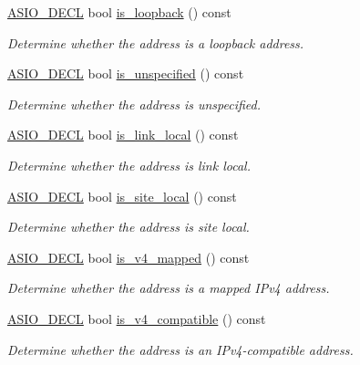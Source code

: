 \begin{DoxyCompactItemize}
\hyperlink{config_8hpp_ab54d01ea04afeb9a8b39cfac467656b7}{A\+S\+I\+O\+\_\+\+D\+E\+C\+L} bool \hyperlink{classasio_1_1ip_1_1address__v6_a36f3bc1edcefbd0d1e30900589ff1f01}{is\+\_\+loopback} () const 
\begin{DoxyCompactList}\small\item\em Determine whether the address is a loopback address. \end{DoxyCompactList}\item 
\hyperlink{config_8hpp_ab54d01ea04afeb9a8b39cfac467656b7}{A\+S\+I\+O\+\_\+\+D\+E\+C\+L} bool \hyperlink{classasio_1_1ip_1_1address__v6_abc235501a0d803a7443f50c373306b31}{is\+\_\+unspecified} () const 
\begin{DoxyCompactList}\small\item\em Determine whether the address is unspecified. \end{DoxyCompactList}\item 
\hyperlink{config_8hpp_ab54d01ea04afeb9a8b39cfac467656b7}{A\+S\+I\+O\+\_\+\+D\+E\+C\+L} bool \hyperlink{classasio_1_1ip_1_1address__v6_ab97ace43f3b44a70cbe60ff3e90fb5a8}{is\+\_\+link\+\_\+local} () const 
\begin{DoxyCompactList}\small\item\em Determine whether the address is link local. \end{DoxyCompactList}\item 
\hyperlink{config_8hpp_ab54d01ea04afeb9a8b39cfac467656b7}{A\+S\+I\+O\+\_\+\+D\+E\+C\+L} bool \hyperlink{classasio_1_1ip_1_1address__v6_a443b4a3488a39f66f202db1f86ee6d73}{is\+\_\+site\+\_\+local} () const 
\begin{DoxyCompactList}\small\item\em Determine whether the address is site local. \end{DoxyCompactList}\item 
\hyperlink{config_8hpp_ab54d01ea04afeb9a8b39cfac467656b7}{A\+S\+I\+O\+\_\+\+D\+E\+C\+L} bool \hyperlink{classasio_1_1ip_1_1address__v6_abe353cbf9be56c252b20383a26bae077}{is\+\_\+v4\+\_\+mapped} () const 
\begin{DoxyCompactList}\small\item\em Determine whether the address is a mapped I\+Pv4 address. \end{DoxyCompactList}\item 
\hyperlink{config_8hpp_ab54d01ea04afeb9a8b39cfac467656b7}{A\+S\+I\+O\+\_\+\+D\+E\+C\+L} bool \hyperlink{classasio_1_1ip_1_1address__v6_a50ea028885a0e4dec1ef57beaa10ae96}{is\+\_\+v4\+\_\+compatible} () const 
\begin{DoxyCompactList}\small\item\em Determine whether the address is an I\+Pv4-\/compatible address. \end{DoxyCompactList}\item 

\end{DoxyCompactItemize}
